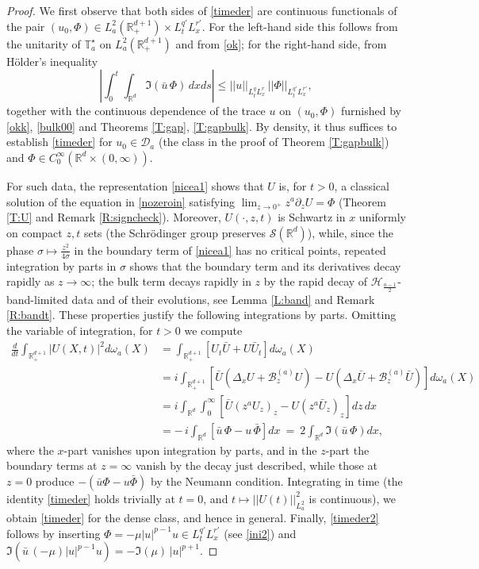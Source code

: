 \documentclass[11pt,letter]{amsart}
\def \RN {\mathbb{R}_+^{d+1}}
\newcommand{\Ba}{\mathscr B_z^{(a)}}
\newcommand{\Rd}{\mathbb R^d}
\newcommand{\p}{\partial}
\numberwithin{equation}{section}
\numberwithin{equation}{section}
\begin{document}
\begin{proof}
We first observe that both sides of \eqref{timeder} are continuous functionals of the pair $(u_0,\Phi)\in L^2_a(\RN)\times L^{q'}_tL^{r'}_x$. For the left-hand side this follows from the unitarity of $\mathbb T^\star_a$ on $L^2_a(\RN)$ and from \eqref{ok}; for the right-hand side, from H\"older's inequality
\[
\left|\int_0^t\int_{\Rd} \Im(\bar u\, \Phi)\, dx ds\right| \le ||u||_{L^q_tL^r_x}\, ||\Phi||_{L^{q'}_tL^{r'}_x},
\]
together with the continuous dependence of the trace $u$ on $(u_0,\Phi)$ furnished by \eqref{okk}, \eqref{bulk00} and Theorems \ref{T:gap}, \ref{T:gapbulk}. By density, it thus suffices to establish \eqref{timeder} for $u_0\in \mathcal D_a$ (the class in the proof of Theorem \ref{T:gapbulk}) and $\Phi\in C_0^\infty(\Rd\times(0,\infty))$.

For such data, the representation \eqref{nicea1} shows that $U$ is, for $t>0$, a classical solution of the equation in \eqref{nozeroin} satisfying $\lim_{z\to0^+}z^a\p_zU = \Phi$ (Theorem \ref{T:U} and Remark \ref{R:signcheck}). Moreover, $U(\cdot,z,t)$ is Schwartz in $x$ uniformly on compact $z, t$ sets (the Schr\"odinger group preserves $\mathscr S(\Rd)$), while, since the phase $\sigma\mapsto \frac{z^2}{4\sigma}$ in the boundary term of \eqref{nicea1} has no critical points, repeated integration by parts in $\sigma$ shows that the boundary term and its derivatives decay rapidly as $z\to\infty$; the bulk term decays rapidly in $z$ by the rapid decay of $\mathcal H_{\frac{a-1}2}$-band-limited data and of their evolutions, see Lemma \ref{L:band} and Remark \ref{R:bandt}. These properties justify the following integrations by parts. Omitting the variable of integration, for $t>0$ we compute
\begin{align*}
\frac{d}{dt} \int_{\RN} |U(X,t)|^2 d\omega_a(X) & = \int_{\RN} \left[U_t \bar U + U \bar U_t\right] d\omega_a(X)
\\
& = i\int_{\RN} \left[\bar U (\Delta_x U + \Ba U) - U (\Delta_x \bar U + \Ba \bar U)\right] d\omega_a(X)
\\
& = i \int_{\Rd} \int_0^\infty \left[\bar U (z^a U_z)_z - U (z^a \bar U_z)_z\right] dz\, dx
\\
& = -\, i \int_{\Rd} \left[\bar u\, \Phi - u\, \bar \Phi\right] dx\ =\ 2 \int_{\Rd} \Im\left(\bar u\, \Phi\right) dx,
\end{align*}
where the $x$-part vanishes upon integration by parts, and in the $z$-part the boundary terms at $z=\infty$ vanish by the decay just described, while those at $z=0$ produce $-(\bar u \Phi - u\bar\Phi)$ by the Neumann condition. Integrating in time (the identity \eqref{timeder} holds trivially at $t=0$, and $t\mapsto ||U(t)||^2_{L^2_a}$ is continuous), we obtain \eqref{timeder} for the dense class, and hence in general. Finally, \eqref{timeder2} follows by inserting $\Phi = -\mu|u|^{p-1}u\in L^{q'}_tL^{r'}_x$ (see \eqref{ini2}) and $\Im\left(\bar u\, (-\mu)|u|^{p-1}u\right) = -\Im(\mu)\, |u|^{p+1}$.
\end{proof}
\end{document}
